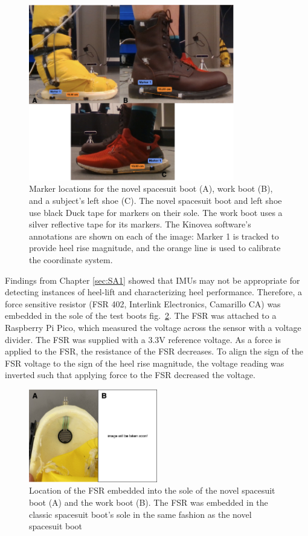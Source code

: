 \documentclass[defaultstyle,11pt]{comps}
\begin{document}
\begin{figure}
\hypertarget{fig:SA4-Kinovea}{%
\centering
\includegraphics[width=0.8\textwidth,height=\textheight]{../fig/SA4/Kinovea.png}
\caption{Marker locations for the novel spacesuit boot (A), work boot (B), and a subject's left shoe (C). The novel spacesuit boot and left shoe use black Duck tape for markers on their sole. The work boot uses a silver reflective tape for its markers. The Kinovea software's annotations are shown on each of the image: Marker 1 is tracked to provide heel rise magnitude, and the orange line is used to calibrate the coordinate system.}\label{fig:SA4-Kinovea}
}
\end{figure}

Findings from Chapter \ref{sec:SA1} showed that IMUs may not be appropriate for detecting instances of heel-lift and characterizing heel performance.
Therefore, a force sensitive resistor (FSR 402, Interlink Electronics, Camarillo CA) was embedded in the sole of the test boots fig.~\ref{fig:SA4-FSRembed}.
The FSR was attached to a Raspberry Pi Pico, which measured the voltage across the sensor with a voltage divider.
The FSR was supplied with a 3.3V reference voltage.
As a force is applied to the FSR, the resistance of the FSR decreases.
To align the sign of the FSR voltage to the sign of the heel rise magnitude, the voltage reading was inverted such that applying force to the FSR decreased the voltage.

\begin{figure}
\hypertarget{fig:SA4-FSRembed}{%
\centering
\includegraphics[width=0.5\textwidth,height=\textheight]{../fig/SA4/FSR_embed.png}
\caption{Location of the FSR embedded into the sole of the novel spacesuit boot (A) and the work boot (B). The FSR was embedded in the classic spacesuit boot's sole in the same fashion as the novel spacesuit boot}\label{fig:SA4-FSRembed}
}
\end{figure}
\end{document}
